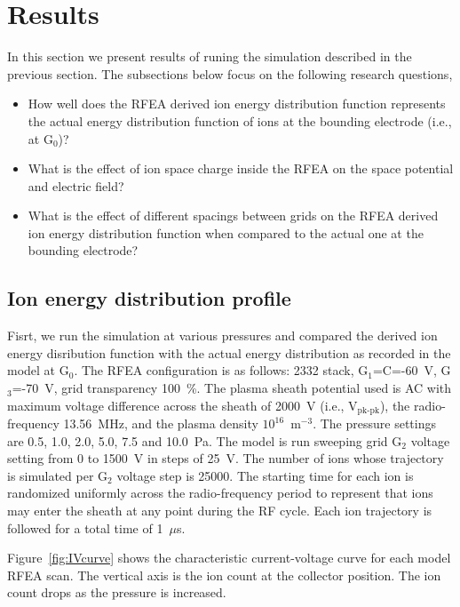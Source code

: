 \section{Results}
In this section we present results of runing the simulation described in the previous section. The subsections below focus on the following research questions, 

\begin{itemize}
  \item How well does the RFEA derived ion energy distribution function represents the actual energy distribution function of ions at the bounding electrode (i.e., at G$_0$)? 
  \item What is the effect of ion space charge inside the RFEA on the space potential and electric field?  
  \item What is the effect of different spacings between grids on the RFEA derived ion energy distribution function when compared to the actual one at the bounding electrode?
\end{itemize}


\subsection{Ion energy distribution profile}
Fisrt, we run the simulation at various pressures and compared the derived ion energy disribution function with the actual energy distribution as recorded in the model at G$_0$. The RFEA configuration is as follows: 2332 stack, G$_1$=C=-60~V, G$_3$=-70~V, grid transparency 100~\%. The plasma sheath potential used is AC with maximum voltage difference across the sheath of 2000~V (i.e., V$_\text{pk-pk}$), the radio-frequency 13.56~MHz, and the plasma density $10^{16}$~m$^{-3}$. The pressure settings are 0.5, 1.0, 2.0, 5.0, 7.5 and 10.0~Pa. The model is run sweeping grid G$_2$ voltage setting from 0 to 1500~V in steps of 25~V. The number of ions whose trajectory is simulated per G$_2$ voltage step is 25000. The starting time for each ion is randomized uniformly across the radio-frequency period to represent that ions may enter the sheath at any point during the RF cycle. Each ion trajectory is followed for a total time of 1~$\mu$s. 

Figure~\ref{fig:IVcurve} shows the characteristic current-voltage curve for each model RFEA scan. The vertical axis is the ion count at the collector position. The ion count drops as the pressure is increased. 

